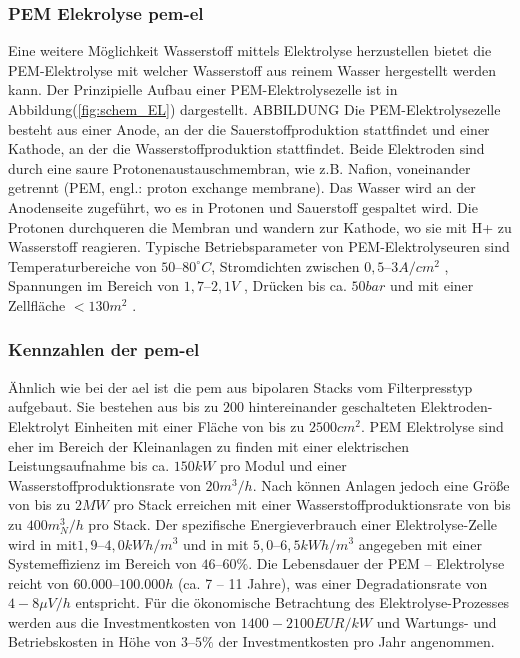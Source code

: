 \documentclass[onecolumn,10pt,titlepage]{article}
\begin{document}
			\subsubsection*{PEM Elekrolyse \gls{pem}-\gls{el}}	
			Eine weitere Möglichkeit Wasserstoff mittels Elektrolyse herzustellen bietet die PEM-Elektrolyse mit welcher Wasserstoff aus reinem Wasser hergestellt werden kann. Der Prinzipielle Aufbau einer PEM-Elektrolysezelle ist in Abbildung(\ref{fig:schem_EL}) dargestellt.
			ABBILDUNG
			Die PEM-Elektrolysezelle besteht aus einer Anode, an der die Sauerstoffproduktion stattfindet und einer Kathode, an der die Wasserstoffproduktion stattfindet.\cite{Smolinka.05.07.2011} Beide Elektroden sind durch eine saure Protonenaustauschmembran, wie z.B. Nafion, voneinander getrennt (PEM, engl.: proton exchange membrane). Das Wasser wird an der Anodenseite zugeführt, wo es in Protonen und Sauerstoff gespaltet wird.\cite{Kurzweil.2015} Die Protonen durchqueren die Membran und wandern zur Kathode, wo sie mit H+ zu Wasserstoff reagieren.
			Typische Betriebsparameter von PEM-Elektrolyseuren sind Temperaturbereiche von $50–80 ^\circ C$, Stromdichten zwischen $0,5–3 A/cm^2$ \cite{EspinosaLopez.2018}, Spannungen im Bereich von $1,7–2,1 V$ \cite{Kurzweil.2015}, Drücken bis ca. $50 bar$ und mit einer Zellfläche $<130 m^2$ \cite{Buttler.2018}. 
			
			\subsubsection*{Kennzahlen der \gls{pem}-\gls{el}}	
			Ähnlich wie bei der \gls{ael} ist die \gls{pem} aus bipolaren Stacks vom Filterpresstyp aufgebaut. Sie bestehen aus bis zu $200$ hintereinander geschalteten Elektroden-Elektrolyt Einheiten mit einer Fläche von bis zu $2500 cm^2$.\cite{Kurzweil.2015} PEM Elektrolyse sind eher im Bereich der Kleinanlagen zu finden mit einer elektrischen Leistungsaufnahme bis ca. $150 kW$ pro Modul \cite{Smolinka.05.07.2011} und einer Wasserstoffproduktionsrate von $20 m^3/h$.\cite{Kurzweil.2015} Nach \cite{Buttler.2018} können Anlagen jedoch eine Größe von bis zu $2 MW$ pro Stack erreichen mit einer Wasserstoffproduktionsrate von bis zu $400 m^3_N/h$ pro Stack. 
			Der spezifische Energieverbrauch einer Elektrolyse-Zelle wird in \cite{Kurzweil.2015} mit$ 1,9–4,0 kWh/m^3$ und in \cite{Buttler.2018} mit $5,0–6,5 kWh/m^3$ angegeben mit einer Systemeffizienz im Bereich von $46–60\%.$ Die Lebensdauer der PEM – Elektrolyse reicht von $60.000–100.000h$ (ca. 7 – 11 Jahre), was einer Degradationsrate von $4-8 \mu V/h$ entspricht. Für die ökonomische Betrachtung des Elektrolyse-Prozesses werden aus \cite{Buttler.2018} die Investmentkosten von $1400-2100 EUR/kW$ und Wartungs- und Betriebskosten in Höhe von $3–5 \%$ der Investmentkosten pro Jahr angenommen.
			
\end{document}
